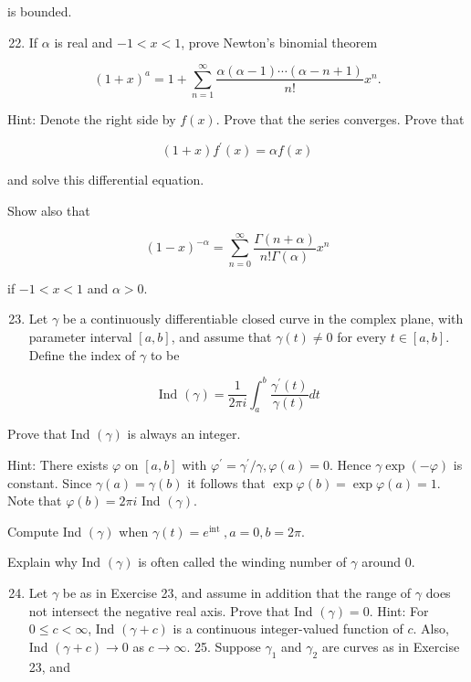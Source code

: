 \documentclass[10pt]{article}
\begin{document}
is bounded.

\begin{enumerate}
  \setcounter{enumi}{21}
  \item If $\alpha$ is real and $-1<x<1$, prove Newton's binomial theorem
\end{enumerate}

$$
(1+x)^{a}=1+\sum_{n=1}^{\infty} \frac{\alpha(\alpha-1) \cdots(\alpha-n+1)}{n !} x^{n} .
$$

Hint: Denote the right side by $f(x)$. Prove that the series converges. Prove that

$$
(1+x) f^{\prime}(x)=\alpha f(x)
$$

and solve this differential equation.

Show also that

$$
(1-x)^{-\alpha}=\sum_{n=0}^{\infty} \frac{\Gamma(n+\alpha)}{n ! \Gamma(\alpha)} x^{n}
$$

if $-1<x<1$ and $\alpha>0$.

\begin{enumerate}
  \setcounter{enumi}{22}
  \item Let $\gamma$ be a continuously differentiable closed curve in the complex plane, with parameter interval $[a, b]$, and assume that $\gamma(t) \neq 0$ for every $t \in[a, b]$. Define the index of $\gamma$ to be
\end{enumerate}

$$
\text { Ind }(\gamma)=\frac{1}{2 \pi i} \int_{a}^{b} \frac{\gamma^{\prime}(t)}{\gamma(t)} d t
$$

Prove that Ind $(\gamma)$ is always an integer.

Hint: There exists $\varphi$ on $[a, b]$ with $\varphi^{\prime}=\gamma^{\prime} / \gamma, \varphi(a)=0$. Hence $\gamma \exp (-\varphi)$ is constant. Since $\gamma(a)=\gamma(b)$ it follows that $\exp \varphi(b)=\exp \varphi(a)=1$. Note that $\varphi(b)=2 \pi i$ Ind $(\gamma)$.

Compute Ind $(\gamma)$ when $\gamma(t)=e^{\text {int }}, a=0, b=2 \pi$.

Explain why Ind $(\gamma)$ is often called the winding number of $\gamma$ around 0.

\begin{enumerate}
  \setcounter{enumi}{23}
  \item Let $\gamma$ be as in Exercise 23, and assume in addition that the range of $\gamma$ does not intersect the negative real axis. Prove that Ind $(\gamma)=0$. Hint: For $0 \leq c<\infty$, Ind $(\gamma+c)$ is a continuous integer-valued function of $c$. Also, Ind $(\gamma+c) \rightarrow 0$ as $c \rightarrow \infty$. 25. Suppose $\gamma_{1}$ and $\gamma_{2}$ are curves as in Exercise 23, and
\end{enumerate}
\end{document}
